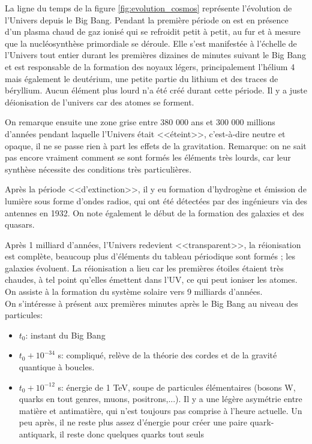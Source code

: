 La ligne du temps de la figure \ref{fig:evolution_cosmos} représente l'évolution de l'Univers depuis le Big Bang. Pendant la première période on est en présence d'un plasma chaud de gaz ionisé qui se refroidit petit à petit, au fur et à mesure que la nucléosynthèse primordiale se déroule. Elle s'est manifestée à l'échelle de l'Univers tout entier durant les premières dizaines de minutes suivant le Big Bang et est responsable de la formation des noyaux légers, principalement l'hélium 4 mais également le deutérium, une petite partie du lithium et des traces de béryllium. Aucun élément plus lourd n'a été créé durant cette période. Il y a juste déionisation de l'univers car des atomes se forment.

On remarque ensuite une zone grise entre 380 000 ans et 300 000 millions d'années pendant laquelle l'Univers était <<éteint>>, c'est-à-dire neutre et opaque, il ne se passe rien à part les effets de la gravitation. Remarque: on ne sait pas encore vraiment comment se sont formés les éléments très lourds, car leur synthèse nécessite des conditions très particulières.

Après la période <<d'extinction>>, il y eu formation d'hydrogène et émission de lumière sous forme d'ondes radios, qui ont été détectées par des ingénieurs via des antennes en 1932. On note également le début de la formation des galaxies et des quasars.

Après 1 milliard d'années, l'Univers redevient <<transparent>>, la réionisation est complète,  beaucoup plus d'éléments du tableau périodique sont formés ; les galaxies évoluent. La réionisation a lieu car les premières étoiles étaient très chaudes, à tel point qu'elles émettent dans l'UV, ce qui peut ioniser les atomes. On assiste à la formation du système solaire vers 9 milliards d'années.\\

On s'intéresse à présent aux premières minutes après le Big Bang au niveau des particules:
\begin{itemize}
    \item $t_0$: instant du Big Bang
    \item $t_0 + 10^{-34}$ s: compliqué, relève de la théorie des cordes et de la gravité quantique à boucles.
    \item $t_0 + 10^{-12}$ s: énergie de 1 TeV, soupe de particules élémentaires (bosons W, quarks en tout genres, muons, positrons,...). Il y a une légère asymétrie entre matière et antimatière, qui n'est toujours pas comprise à l'heure actuelle. Un peu après, il ne reste plus assez d'énergie pour créer une paire quark-antiquark, il reste donc quelques quarks tout seuls
\end{itemize}

